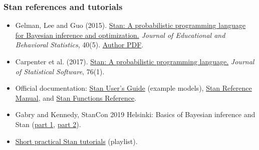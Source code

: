\documentclass[10pt]{beamer}
\begin{document}
\begin{frame}

\frametitle{Stan references and tutorials}

  \begin{itemize}
  \item Gelman, Lee and Guo (2015).
    \href{https://doi.org/10.3102/1076998615606113}{Stan: A probabilistic programming language for Bayesian inference and optimization.}
    \emph{Journal of Educational and Behavioral Statistics}, 40(5).
    \href{https://sites.stat.columbia.edu/gelman/research/published/stan_jebs_2.pdf}{Author PDF}.
  \item Carpenter et al. (2017).
    \href{https://doi.org/10.18637/jss.v076.i01}{Stan: A probabilistic programming language.}
    \emph{Journal of Statistical Software}, 76(1).
  \item Official documentation:
    \href{https://mc-stan.org/docs/stan-users-guide/}{Stan User's Guide}
    (example models),
    \href{https://mc-stan.org/docs/reference-manual/}{Stan Reference Manual}, and
    \href{https://mc-stan.org/docs/functions-reference/}{Stan Functions Reference}.
  \item Gabry and Kennedy, StanCon 2019 Helsinki:
    Basics of Bayesian inference and Stan
    (\href{https://www.youtube.com/watch?v=ZRpo41l02KQ}{part 1},
    \href{https://www.youtube.com/watch?v=6cc4N1vT8pk}{part 2}).
  \item \href{https://www.youtube.com/playlist?list=PLCrWEzJgSUqwL85xIj1wubGdY15C5Gf7H}{Short practical Stan tutorials} (playlist).
  \end{itemize}
\end{frame}
\end{document}
